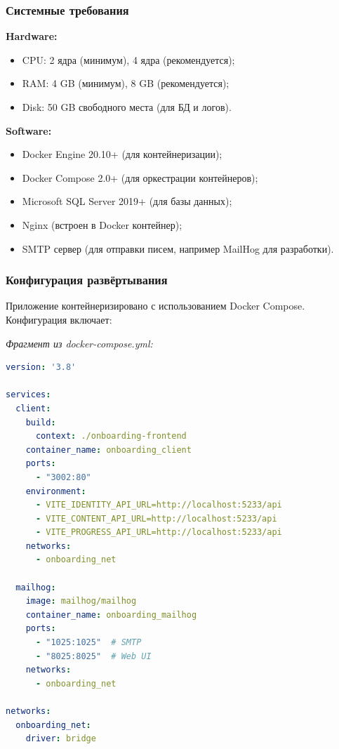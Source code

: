 \subsubsection{Системные требования}

\textbf{Hardware:}
\begin{itemize}
    \item CPU: 2 ядра (минимум), 4 ядра (рекомендуется);
    \item RAM: 4 GB (минимум), 8 GB (рекомендуется);
    \item Disk: 50 GB свободного места (для БД и логов).
\end{itemize}

\textbf{Software:}
\begin{itemize}
    \item Docker Engine 20.10+ (для контейнеризации);
    \item Docker Compose 2.0+ (для оркестрации контейнеров);
    \item Microsoft SQL Server 2019+ (для базы данных);
    \item Nginx (встроен в Docker контейнер);
    \item SMTP сервер (для отправки писем, например MailHog для разработки).
\end{itemize}

\subsubsection{Конфигурация развёртывания}

Приложение контейнеризировано с использованием Docker Compose. Конфигурация включает:

\textit{Фрагмент из docker-compose.yml:}
\begin{lstlisting}[language=yaml, basicstyle=\ttfamily\small]
version: '3.8'

services:
  client:
    build:
      context: ./onboarding-frontend
    container_name: onboarding_client
    ports:
      - "3002:80"
    environment:
      - VITE_IDENTITY_API_URL=http://localhost:5233/api
      - VITE_CONTENT_API_URL=http://localhost:5233/api
      - VITE_PROGRESS_API_URL=http://localhost:5233/api
    networks:
      - onboarding_net

  mailhog:
    image: mailhog/mailhog
    container_name: onboarding_mailhog
    ports:
      - "1025:1025"  # SMTP
      - "8025:8025"  # Web UI
    networks:
      - onboarding_net

networks:
  onboarding_net:
    driver: bridge
\end{lstlisting}

